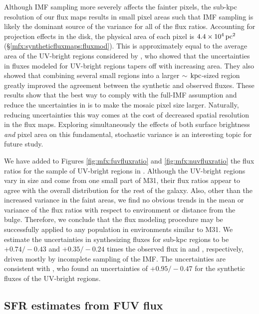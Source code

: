 \documentclass[iop, tighten]{emulateapj}
\begin{document}
Although IMF sampling more severely affects the fainter pixels, the sub-kpc
resolution of our flux maps results in small pixel areas such that IMF sampling
is likely the dominant source of the variance for all of the flux ratios.
Accounting for projection effects in the disk, the physical area of each pixel
is $4.4\times 10^4\,\mathrm{pc}^2$ (\S \ref{mfx:syntheticfluxmaps:fluxmod}). This is
approximately equal to the average area of the UV-bright regions considered by
\citet{Simones:2014}, who showed that the uncertainties in fluxes modeled for
UV-bright regions tapers off with increasing area. They also showed that
combining several small regions into a larger $\sim\,\mathrm{kpc}$-sized region greatly
improved the agreement between the synthetic and observed fluxes. These results
show that the best way to comply with the full-IMF assumption and reduce the
uncertainties in \fxsfh{} is to make the mosaic pixel size larger. Naturally,
reducing uncertainties this way comes at the cost of decreased spatial
resolution in the flux maps. Exploring simultaneously the effects of both
surface brightness \emph{and} pixel area on this fundamental, stochastic
variance is an interesting topic for future study.

We have added to Figures \ref{fig:mfx:fuvfluxratio} and
\ref{fig:mfx:nuvfluxratio} the flux ratios for the sample of UV-bright regions
in \citet{Simones:2014}. Although the UV-bright regions vary in size and come
from one small part of M31, their flux ratios appear to agree with the overall
distribution for the rest of the galaxy. Also, other than the increased
variance in the faint areas, we find no obvious trends in the mean or variance
of the flux ratios with respect to environment or distance from the bulge.
Therefore, we conclude that the flux modeling procedure may be successfully
applied to any population in environments similar to M31. We estimate the
uncertainties in synthesizing fluxes for sub-kpc regions to be $+\!0.74/\!-\!0.43$
and $+\!0.35/\!-\!0.24$ times the observed flux in \fuv{} and \nuv{}, respectively,
driven mostly by incomplete sampling of the IMF. The \ffuvsfh{} uncertainties
are consistent with \citet{Simones:2014}, who found an uncertainties of
$+\!0.95/\!-\!0.47$ for the synthetic \fuv{} fluxes of the UV-bright regions.



\subsection{SFR estimates from FUV flux}
\end{document}
